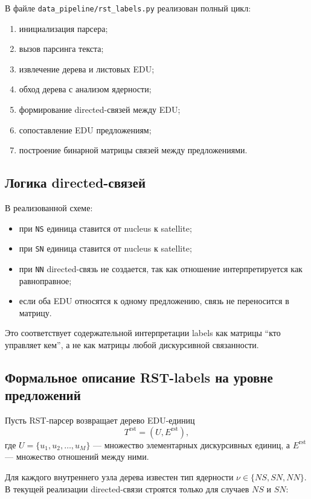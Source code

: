 \documentclass[12pt,a4paper]{article}
\begin{document}
В файле \texttt{data\_pipeline/rst\_labels.py} реализован полный цикл:

\begin{enumerate}
    \item инициализация парсера;
    \item вызов парсинга текста;
    \item извлечение дерева и листовых EDU;
    \item обход дерева с анализом ядерности;
    \item формирование directed-связей между EDU;
    \item сопоставление EDU предложениям;
    \item построение бинарной матрицы связей между предложениями.
\end{enumerate}

\subsection{Логика directed-связей}

В реализованной схеме:

\begin{itemize}
    \item при \texttt{NS} единица ставится от nucleus к satellite;
    \item при \texttt{SN} единица ставится от nucleus к satellite;
    \item при \texttt{NN} directed-связь не создается, так как отношение интерпретируется
    как равноправное;
    \item если оба EDU относятся к одному предложению, связь не переносится в матрицу.
\end{itemize}

Это соответствует содержательной интерпретации labels как матрицы ``кто управляет кем'',
а не как матрицы любой дискурсивной связанности.

\subsection{Формальное описание RST-labels на уровне предложений}

Пусть RST-парсер возвращает дерево EDU-единиц
\[
T^{\text{rst}} = (U, E^{\text{rst}}),
\]
где $U = \{u_1, u_2, \dots, u_M\}$ --- множество элементарных дискурсивных единиц, а
$E^{\text{rst}}$ --- множество отношений между ними.

Для каждого внутреннего узла дерева известен тип ядерности $\nu \in \{NS, SN, NN\}$.
В текущей реализации directed-связи строятся только для случаев $NS$ и $SN$:
\end{document}
